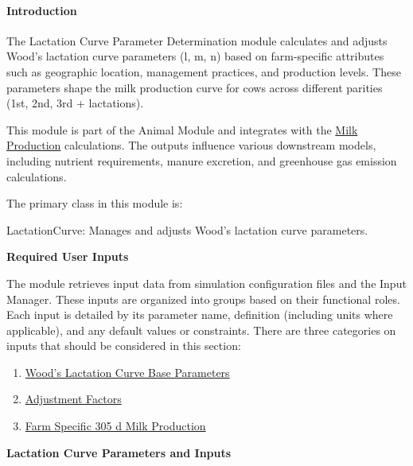 \documentclass{article}
\renewcommand{\headrulewidth}{0pt}  %
\renewcommand{\footrulewidth}{0.4pt}
\renewcommand{\headrulewidth}{0pt}
\renewcommand{\footrulewidth}{0pt}
\begin{document}
\begin{refsection}
    \paragraph{Introduction} The Lactation Curve Parameter Determination module calculates and adjusts Wood’s lactation curve parameters (l, m, n) based on farm-specific attributes such as geographic location, management practices, and production levels. These parameters shape the milk production curve for cows across different parities (1st, 2nd, 3rd + lactations).
    
    This module is part of the Animal Module and integrates with the \hyperref[milkprod]{Milk Production} calculations. The outputs influence various downstream models, including nutrient requirements, manure excretion, and greenhouse gas emission calculations.
    
    The primary class in this module is:
    
    LactationCurve: Manages and adjusts Wood’s lactation curve parameters.

\textbf{\hypertarget{lactcurvreqinputs}{Required User Inputs}}
\vspace{-0.25cm}

 The module retrieves input data from simulation configuration files and the Input Manager. These inputs are organized into groups based on their functional roles. Each input is detailed by its parameter name, definition (including units where applicable), and any default values or constraints. There are three categories on inputs that should be considered in this section: 
 \begin{enumerate}
     \item \hyperlink{woodscurve}{Wood's Lactation Curve Base Parameters}
     \item \hyperlink{lactcurvadjust}{Adjustment Factors}
     \item \hyperlink{farmspec305}{Farm Specific 305 d Milk Production}
 \end{enumerate}
 \vspace{0.1cm}

\newpage
\begin{landscape}

\textbf{ \hypertarget{woodscurve}{\large Lactation Curve Parameters and Inputs}} 

\fancypagestyle{landscapeplain}{
  \fancyhf{} %
  \renewcommand{\headrulewidth}{0pt}
  \renewcommand{\footrulewidth}{0pt}
}
\pagestyle{landscapeplain}


\end{landscape}
\end{refsection}
\end{document}
